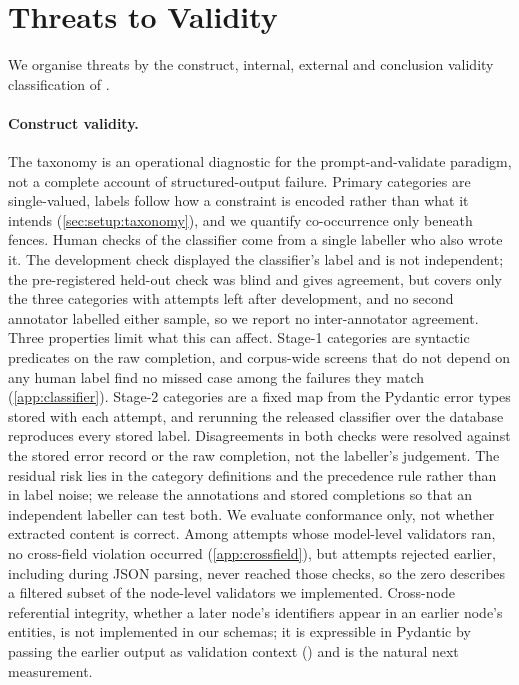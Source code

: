 \section{Threats to Validity}
\label{sec:threats}

We organise threats by the construct, internal, external and conclusion
validity classification of \citet{wohlin2012experimentation}.

\paragraph{Construct validity.}
The taxonomy is an operational diagnostic for the prompt-and-validate
paradigm, not a complete account of structured-output failure. Primary
categories are single-valued, labels follow how a constraint is encoded
rather than what it intends (\cref{sec:setup:taxonomy}), and we quantify
co-occurrence only beneath fences. Human checks of the classifier come from a single labeller who also
wrote it. The development check displayed the classifier's label and is
not independent; the pre-registered held-out check was blind and gives
 agreement, but covers only the three categories with
attempts left after development, and no second annotator labelled either
sample, so we report no inter-annotator agreement. Three properties limit what this can affect.
Stage-1 categories are syntactic predicates on the raw completion, and
corpus-wide screens that do not depend on any human label find no
missed case among the failures they match (\cref{app:classifier}). Stage-2 categories are a fixed map
from the Pydantic error types stored with each attempt, and rerunning the
released classifier over the database reproduces every stored label.
Disagreements in both checks were resolved against the stored error
record or the raw completion, not the labeller's judgement. The residual
risk lies in the category definitions and the precedence rule rather than
in label noise; we release the annotations and stored completions so that
an independent labeller can test both. We evaluate conformance only, not whether extracted content
is correct. Among attempts whose model-level validators ran, no
cross-field violation occurred (\cref{app:crossfield}), but attempts
rejected earlier, including during JSON parsing, never reached those
checks, so the zero describes a filtered subset of the node-level
validators we implemented. Cross-node referential integrity, whether a
later node's identifiers appear in an earlier node's entities, is not
implemented in our schemas; it is expressible in Pydantic by passing the
earlier output as validation context
() and is the natural
next measurement.

